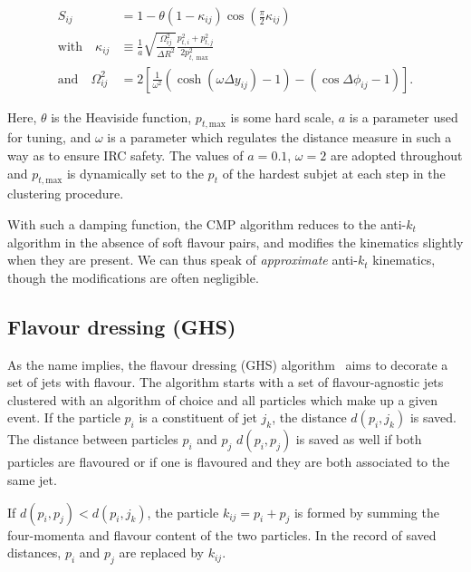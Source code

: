 \documentclass[10pt,a4paper]{book}
\begin{document}
\begin{equation}
\begin{aligned}
    S_{ij} &= 1 - \theta \left(1 - \kappa_{ij}\right) \cos\left(\frac{\pi}{2} \kappa_{ij}\right) \\
    \text{with} \quad \kappa_{ij} &\equiv \frac{1}{a} \sqrt{\frac{\Omega_{ij}^2}{\Delta R^2}} \frac{p^2_{t,i} + p^2_{t,j}}{2p^2_{t,\max}} \\
    \text{and} \quad \Omega_{ij}^2 &= 2 \left[ \frac{1}{\omega^2} \left( \cosh(\omega \Delta y_{ij}) - 1 \right) - \left( \cos \Delta \phi_{ij} - 1 \right) \right].
\end{aligned}
\label{eq:cmp}
\end{equation}

Here, $\theta$ is the Heaviside function, $p_{t, \text{max}}$ is some hard scale, $a$ is a parameter used for tuning, and $\omega$ is a parameter which regulates the distance measure in such a way as to ensure IRC safety. The values of $a = 0.1$, $\omega = 2$ are adopted throughout and $p_{t,\text{max}}$ is dynamically set to the $p_t$ of the hardest subjet at each step in the clustering procedure.

With such a damping function, the CMP algorithm reduces to the anti-$k_t$ algorithm in the absence of soft flavour pairs, and modifies the kinematics slightly when they are present. We can thus speak of \emph{approximate} anti-$k_t$ kinematics, though the modifications are often negligible.

\subsection{Flavour dressing (GHS)}

As the name implies, the flavour dressing (GHS) algorithm~\cite{Gauld:2022lem} aims to decorate a set of jets with flavour. The algorithm starts with a set of flavour-agnostic jets clustered with an algorithm of choice and all particles which make up a given event. If the particle $p_i$ is a constituent of jet $j_k$, the distance $d(p_i, j_k)$ is saved. The distance between particles $p_i$ and $p_j$ $d(p_i, p_j)$ is saved as well if both particles are flavoured or if one is flavoured and they are both associated to the same jet. 

If $d(p_i, p_j) < d(p_i, j_k)$, the particle $k_{ij} = p_i + p_j$ is formed by summing the four-momenta and flavour content of the two particles. In the record of saved distances, $p_i$ and $p_j$ are replaced by $k_{ij}$.
\end{document}
